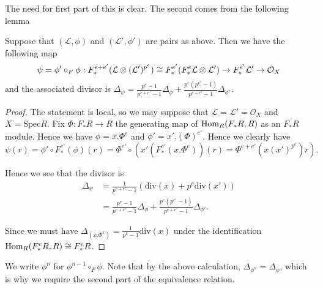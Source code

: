 The need for first part of this is clear. The second comes from the following lemma

\begin{lemma}\label{twist}
	Suppose that $(\mathcal{L},\phi)$ and $(\mathcal{L}',\phi')$ are pairs as above. Then we have the following map
	\[\psi= \phi' \circ_{F} \phi: F^{e+e'}_{*}(\mathcal{L}\otimes (\mathcal{L}')^{p^{e}})\cong F_{*}^{e'}(F^{e}_{*} \mathcal{L} \otimes \mathcal{L}')\to F^{e'}_{*}\mathcal{L}'\to \mathcal{O}_{X} \]
	and the associated divisor is $\Delta_{\psi}= \frac{p^{e}-1}{p^{e+e'}-1}\Delta_{\phi} + \frac{p^{e}(p^{e'}-1)}{p^{e+e'}-1}\Delta_{\phi'}$.

\end{lemma}

\begin{proof}
	
	The statement is local, so we may suppose that $\mathcal{L}=\mathcal{L}'=\mathcal{O}_{X}$ and $X= \text{Spec}R$. Fix $\Phi: F_{*}R \to R$ the generating map of $\textup{Hom}_{R}(F_{*}R,R)$ as an $F_{*}R$ module. Hence we have $\phi=x.\Phi^{e}$ and $\phi'=x'.(\Phi)^{e'}$. Hence we clearly have $$\psi(r)=\phi'\circ F_{*}^{e'}(\phi)(r)= \Phi^{e'}\circ (x'(F_{*}^{e'}(x.\Phi^{e}))(r)=\Phi^{e+e'}(x(x')^{p^{e}})r).$$
	
	
	Hence we see that the divisor is 
	\begin{align*}
	\Delta_{\psi} &= \frac{1}{p^{e+e'}-1}(\text{div}(x) + p^{e}\text{div}(x')) \\
	&=\frac{p^{e}-1}{p^{e+e'}-1}\Delta_{\phi} + \frac{p^{e}(p^{e'}-1)}{p^{e+e'}-1}\Delta_{\phi'}.
	\end{align*}
	
	Since we must have $\Delta_{(x.\Phi^{k})}= \frac{1}{p^{k}-1} \text{div}(x)$ under the identification $\textup{Hom}_{R}(F^{e}_{*} R,R) \cong F^{e}_{*} R$.

	
\end{proof}

We write $\phi^{n}$ for $\phi^{n-1}\circ_{F} \phi$. Note that by the above calculation, $\Delta_{\phi^{n}}=\Delta_{\phi}$, which is why we require the second part of the equivalence relation.

